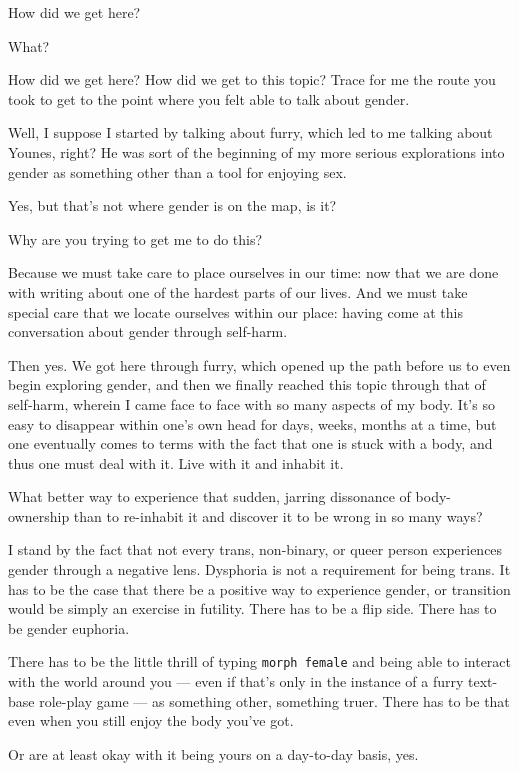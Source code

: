 \label{gender:gender}
\begin{paracol}{2}
\begin{leftcolumn}

\begin{ally}
How did we get here?
\end{ally}
What?

\begin{ally}
How did we get here? How did we get to this topic? Trace for me the route you took to get to the point where you felt able to talk about gender.
\end{ally}
Well, I suppose I started by talking about furry, which led to me talking about Younes, right? He was sort of the beginning of my more serious explorations into gender as something other than a tool for enjoying sex.

\begin{ally}
Yes, but that's not where gender is on the map, is it?
\end{ally}
Why are you trying to get me to do this?

\begin{ally}
Because we must take care to place ourselves in our time: now that we are done with writing about one of the hardest parts of our lives. And we must take special care that we locate ourselves within our place: having come at this conversation about gender through self-harm.
\end{ally}
Then yes. We got here through furry, which opened up the path before us to even begin exploring gender, and then we finally reached this topic through that of self-harm, wherein I came face to face with so many aspects of my body. It's so easy to disappear within one's own head for days, weeks, months at a time, but one eventually comes to terms with the fact that one is stuck with a body, and thus one must deal with it. Live with it and inhabit it.

What better way to experience that sudden, jarring dissonance of body-ownership than to re-inhabit it and discover it to be wrong in so many ways?
\newpage

\noindent I stand by the fact that not every trans, non-binary, or queer person experiences gender through a negative lens. Dysphoria is not a requirement for being trans. It has to be the case that there be a positive way to experience gender, or transition would be simply an exercise in futility. There has to be a flip side. There has to be gender euphoria.

\begin{ally}
There has to be the little thrill of typing \texttt{morph\ female} and being able to interact with the world around you --- even if that's only in the instance of a furry text-base role-play game --- as something other, something truer. There has to be that even when you still enjoy the body you've got.
\end{ally}
Or are at least okay with it being yours on a day-to-day basis, yes.


\end{leftcolumn}
\end{paracol}
